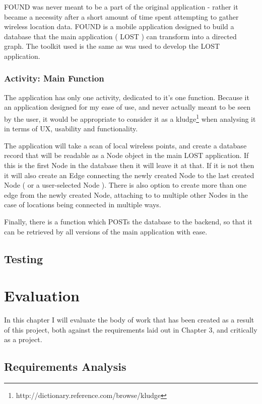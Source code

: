\documentclass[11pt]{informatics-report}
\begin{document}
FOUND was never meant to be a part of the original application - rather it became a necessity after a short amount of time spent attempting to gather wireless location data. FOUND is a mobile application designed to build a database that the main application ( LOST ) can transform into a directed graph. The toolkit used is the same as was used to develop the LOST application.

\subsection{Activity: Main Function}
The application has only one activity, dedicated to it's one function. Because it an application designed for my ease of use, and never actually meant to be seen by the user, it would be appropriate to consider it as a  kludge\footnote{http://dictionary.reference.com/browse/kludge} when analysing it in terms of UX, usability and functionality.

The application will take a scan of local wireless points, and create a database record that will be readable as a Node object in the main LOST application. If this is the first Node in the database then it will leave it at that. If it is not then it will also create an Edge connecting the newly created Node to the last created Node ( or a user-selected Node ). There is also option to create more than one edge from the newly created Node, attaching to to multiple other Nodes in the case of locations being connected in multiple ways.

Finally, there is a function which POSTs the database to the backend, so that it can be retrieved by all versions of the main application with ease.

\section{Testing}



\chapter{Evaluation}

In this chapter I will evaluate the body of work that has been created as a result of this project, both against the requirements laid out in Chapter 3, and critically as a project.

\section{Requirements Analysis}
\end{document}

